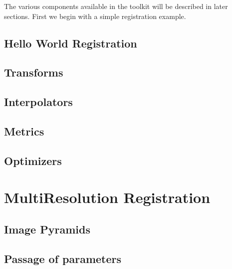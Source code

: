The various components available in the toolkit will be described in later sections.
First we begin with a simple registration example.

\section{Hello World Registration}
\label{sec:IntroductionImageRegistration}



\section{Transforms}
\label{sec:Transforms}


\section{Interpolators}
\label{sec:Interpolators}


\section{Metrics}
\label{sec:Metrics}


\section{Optimizers}
\label{sec:Optimizers}

\chapter{MultiResolution Registration}
\label{sec:MultiResolutionRegistration}

\section{Image Pyramids}
\label{sec:ImagePyramids}


\section{Passage of parameters}
\label{sec:MultiResolutionParametersPassing}


